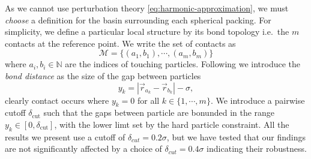 \documentclass[11pt,twoside]{report}
\begin{document}
As we cannot use perturbation theory \eqref{eq:harmonic-approximation}, we must \emph{choose} a definition for the basin surrounding each spherical packing.
For simplicity, we define a particular local structure by its bond topology i.e.\ the $m$ contacts at the reference point.
We write the set of contacts as
\begin{equation}\label{eq:structure-contacts}
  \mathcal{M} = \{(a_1, b_1), \cdots, (a_m, b_m)\}
\end{equation}
where $a_i, b_i \in \mathbb{N}$ are the indices of touching particles.
Following \cite{Holmes-CerfonPNAS2013} we introduce the \emph{bond distance} as the size of the gap between particles
\begin{equation}\label{eq:bond-distance}
  y_k = |\vec{r}_{a_k} - \vec{r}_{b_k}| - \sigma,
\end{equation}
clearly contact occurs where $y_k = 0$ for all $k \in \{1, \cdots, m\}$.
We introduce a pairwise cutoff $\delta_\mathrm{cut}$ such that the gaps between particle are bonunded in the range $y_k \in [0, \delta_\mathrm{cut}]$, with the lower limt set by the hard particle constraint.
All the results we present use a cutoff of $\delta_{cut}=0.2 \sigma$, but we have tested that our findings are not significantly affected by a choice of $\delta_{cut}=0.4 \sigma$ indicating their robustness.

\end{document}
